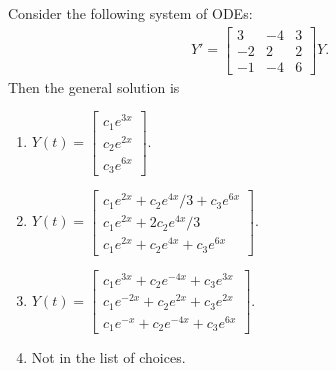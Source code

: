 \documentclass[12pt]{article}
\begin{document}
	Consider the following system of ODEs:
		\begin{align*}
		Y' = 
		\begin{bmatrix}
		3 & -4 & 3 \\
		-2 & 2 & 2 \\
		-1 & -4 & 6
		\end{bmatrix} Y .
		\end{align*}
	Then the general solution is
		\begin{multicols}{2}
		\begin{enumerate}[label=\alph*)]
		\item $Y (t) = \begin{bmatrix}
		c_1 e^{3x} \\ c_2 e^{2x} \\ c_3 e^{6x} 
		\end{bmatrix}$.
		\item $Y(t) = \begin{bmatrix}
		c_1 e^{2x} + c_2 e^{4x}/3 + c_3 e^{6x} \\
		c_1 e^{2x} + 2c_2 e^{4x} / 3 \\
		c_1 e^{2x} + c_2 e^{4x} + c_3 e^{6x}
		\end{bmatrix}$.
		\item $Y(t) = \begin{bmatrix}
		c_1 e^{3x} + c_2 e^{-4x} + c_3 e^{3x} \\
		c_1 e^{-2x} + c_2 e^{2x} + c_3 e^{2x} \\
		c_1 e^{-x} + c_2 e^{-4x} + c_3 e^{6x}
		\end{bmatrix}$.
		\item Not in the list of choices.
		\end{enumerate}
		\end{multicols}
	
	
	
	
\end{document}
